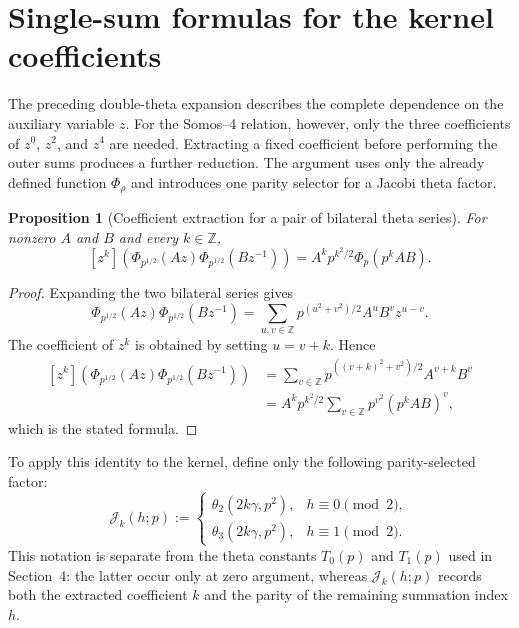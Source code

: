 \documentclass[11pt]{article}
\newtheorem{proposition}{Proposition}[section]
\numberwithin{equation}{section}
\begin{document}
\section{Single-sum formulas for the kernel coefficients}
The preceding double-theta expansion describes the complete dependence on the
auxiliary variable $z$.  For the Somos--4 relation, however, only the three
coefficients of $z^0$, $z^2$, and $z^4$ are needed.  Extracting a fixed
coefficient before performing the outer sums produces a further reduction.
The argument uses only the already defined function $\Phi_\rho$ and introduces
one parity selector for a Jacobi theta factor.

\begin{proposition}[Coefficient extraction for a pair of bilateral theta series]
For nonzero $A$ and $B$ and every $k\in\mathbb Z$,
\begin{equation}
\boxed{
[z^k]\left(
\Phi_{p^{1/2}}(Az)\Phi_{p^{1/2}}(Bz^{-1})
\right)
=A^kp^{k^2/2}\Phi_p(p^kAB).
}
\end{equation}
\end{proposition}
\begin{proof}
Expanding the two bilateral series gives
\begin{equation}
\Phi_{p^{1/2}}(Az)\Phi_{p^{1/2}}(Bz^{-1})
=\sum_{u,v\in\mathbb Z}
p^{(u^2+v^2)/2}A^uB^v z^{u-v}.
\end{equation}
The coefficient of $z^k$ is obtained by setting $u=v+k$.  Hence
\begin{equation}
\begin{aligned}
[z^k]\left(
\Phi_{p^{1/2}}(Az)\Phi_{p^{1/2}}(Bz^{-1})
\right)
&=\sum_{v\in\mathbb Z}
p^{((v+k)^2+v^2)/2}A^{v+k}B^v\\
&=A^kp^{k^2/2}\sum_{v\in\mathbb Z}p^{v^2}(p^kAB)^v,
\end{aligned}
\end{equation}
which is the stated formula.
\end{proof}

To apply this identity to the kernel, define only the following
parity-selected factor:
\begin{equation}
\boxed{
\mathcal J_k(h;p):=
\begin{cases}
\theta_2(2k\gamma,p^2),&h\equiv0\pmod2,\\
\theta_3(2k\gamma,p^2),&h\equiv1\pmod2.
\end{cases}}
\end{equation}
This notation is separate from the theta constants $T_0(p)$ and $T_1(p)$ used
in Section~4: the latter occur only at zero argument, whereas
$\mathcal J_k(h;p)$ records both the extracted coefficient $k$ and the parity
of the remaining summation index $h$.
\end{document}
